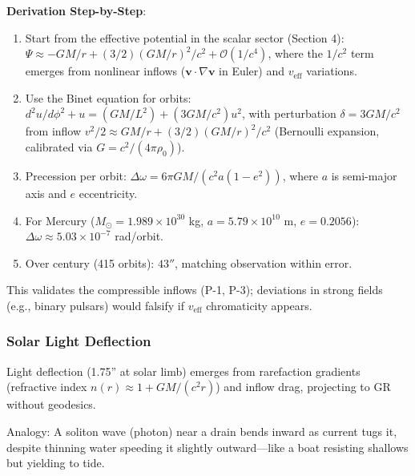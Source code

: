\documentclass{article}
\begin{document}
\textbf{Derivation Step-by-Step}:
\begin{enumerate}
    \item Start from the effective potential in the scalar sector (Section 4): $\Psi \approx -GM/r + (3/2) (GM/r)^2 / c^2 + \mathcal{O}(1/c^4)$, where the $1/c^2$ term emerges from nonlinear inflows ($\mathbf{v} \cdot \nabla \mathbf{v}$ in Euler) and $v_{\text{eff}}$ variations.
    \item Use the Binet equation for orbits: $d^2 u / d\phi^2 + u = (GM / L^2) + (3 GM / c^2) u^2$, with perturbation $\delta = 3 GM / c^2$ from inflow $v^2 / 2 \approx GM / r + (3/2) (GM / r)^2 / c^2$ (Bernoulli expansion, calibrated via $G = c^2 / (4\pi \rho_0)$).
    \item Precession per orbit: $\Delta\omega = 6\pi GM / (c^2 a (1-e^2))$, where $a$ is semi-major axis and $e$ eccentricity.
    \item For Mercury ($M_\odot = 1.989 \times 10^{30}$ kg, $a = 5.79 \times 10^{10}$ m, $e=0.2056$): $\Delta\omega \approx 5.03 \times 10^{-7}$ rad/orbit.
    \item Over century (415 orbits): $43''$, matching observation within error.
\end{enumerate}

This validates the compressible inflows (P-1, P-3); deviations in strong fields (e.g., binary pulsars) would falsify if $v_{\text{eff}}$ chromaticity appears.

\subsubsection{Solar Light Deflection}

Light deflection (1.75'' at solar limb) emerges from rarefaction gradients (refractive index $n(r) \approx 1 + GM/(c^2 r)$) and inflow drag, projecting to GR without geodesics.

Analogy: A soliton wave (photon) near a drain bends inward as current tugs it, despite thinning water speeding it slightly outward—like a boat resisting shallows but yielding to tide.
\end{document}
